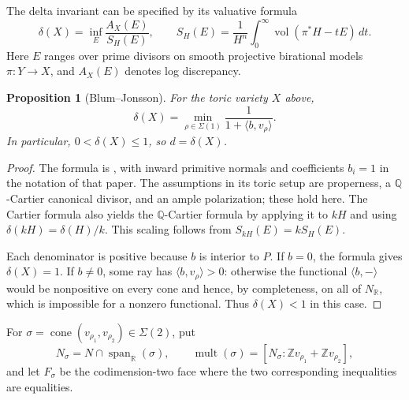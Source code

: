 \documentclass[12pt]{amsart}
\newtheorem{prop}[thm]{Proposition}
\theoremstyle{definition}
\theoremstyle{remark}
\numberwithin{equation}{section}
\theoremstyle{plain}
\theoremstyle{definition}
\theoremstyle{remark}
\begin{document}
The delta invariant can be specified by its valuative formula
\[
 \delta(X)=\inf_E\frac{A_X(E)}{S_H(E)},\qquad
 S_H(E)=\frac1{H^n}\int_0^\infty
       \operatorname{vol}(\pi^*H-tE)\,dt.
\]
Here $E$ ranges over prime divisors on smooth projective birational models
$\pi:Y\to X$, and $A_X(E)$ denotes log discrepancy.

\begin{prop}[Blum--Jonsson]\label{en:prop:delta}
For the toric variety $X$ above,
\begin{equation}\label{en:eq:delta}
 \delta(X)=\min_{\rho\in\Sigma(1)}
       \frac1{1+\langle b,v_\rho\rangle}.
\end{equation}
In particular, $0<\delta(X)\le1$, so $d=\delta(X)$.
\end{prop}
\begin{proof}
The formula is \cite[Corollary~7.16 and \S7.6]{en:BJ}, with inward primitive normals and coefficients $b_i=1$ in the notation of that paper. The assumptions in its toric setup are properness, a $\mathbb Q$-Cartier canonical divisor, and an ample polarization; these hold here. The Cartier formula also yields the $\mathbb Q$-Cartier formula by applying it to $kH$ and using $\delta(kH)=\delta(H)/k$. This scaling follows from $S_{kH}(E)=kS_H(E)$.

Each denominator is positive because $b$ is interior to $P$. If $b=0$, the formula gives $\delta(X)=1$. If $b\ne0$, some ray has $\langle b,v_\rho\rangle>0$: otherwise the functional $\langle b,-\rangle$ would be nonpositive on every cone and hence, by completeness, on all of $N_{\mathbb R}$, which is impossible for a nonzero functional. Thus $\delta(X)<1$ in this case.
\end{proof}

For $\sigma=\operatorname{cone}(v_{\rho_1},v_{\rho_2})\in\Sigma(2)$, put
\[
 N_\sigma=N\cap\operatorname{span}_{\mathbb R}(\sigma),\qquad
 \operatorname{mult}(\sigma)
 =[N_\sigma:\mathbb Zv_{\rho_1}+\mathbb Zv_{\rho_2}],
\]
and let $F_\sigma$ be the codimension-two face where the two corresponding inequalities are equalities.
\end{document}
